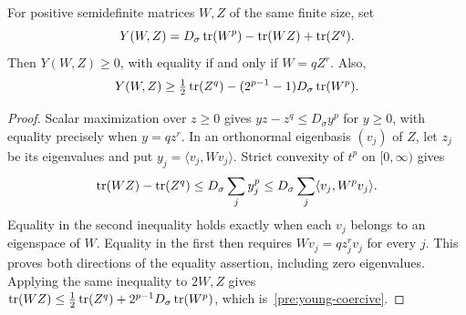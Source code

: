 \begin{lemma}\label{pre:young}
For positive semidefinite matrices $W,Z$ of the same finite size, set
\begin{equation}\label{pre:young-defect}
 Y(W,Z)=D_\sigma\operatorname{tr}(W^p)-\operatorname{tr}(WZ)+\operatorname{tr}(Z^q).
\end{equation}
Then $Y(W,Z)\ge0$, with equality if and only if $W=qZ^r$.
Also,
\begin{equation}\label{pre:young-coercive}
 Y(W,Z)\ge\tfrac12\operatorname{tr}(Z^q)
       -(2^{p-1}-1)D_\sigma\operatorname{tr}(W^p).
\end{equation}
\end{lemma}

\begin{proof}
Scalar maximization over $z\ge0$ gives
$yz-z^q\le D_\sigma y^p$ for $y\ge0$, with equality precisely when
$y=qz^r$. In an orthonormal eigenbasis $(v_j)$ of $Z$, let $z_j$ be its
eigenvalues and put $y_j=\langle v_j,Wv_j\rangle$. Strict convexity of
$t^p$ on $[0,\infty)$ gives
\[
 \operatorname{tr}(WZ)-\operatorname{tr}(Z^q)
 \le D_\sigma\sum_j y_j^p
 \le D_\sigma\sum_j\langle v_j,W^pv_j\rangle.
\]
Equality in the second inequality holds exactly when each $v_j$ belongs
to an eigenspace of $W$. Equality in the first then requires
$Wv_j=qz_j^rv_j$ for every $j$. This proves both directions of the
equality assertion, including zero eigenvalues. Applying the same
inequality to $2W,Z$ gives
$\operatorname{tr}(WZ)\le\tfrac12\operatorname{tr}(Z^q)+2^{p-1}D_\sigma\operatorname{tr}(W^p)$,
which is~\eqref{pre:young-coercive}.
\end{proof}
